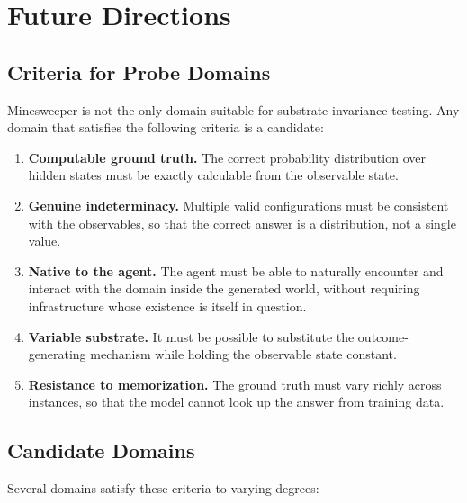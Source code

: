 \documentclass[12pt,a4paper]{article}
\begin{document}
\section{Future Directions}
\label{sec:future}

\subsection{Criteria for Probe Domains}
\label{sec:criteria}

Minesweeper is not the only domain suitable for substrate invariance testing. Any domain that satisfies the following criteria is a candidate:

\begin{enumerate}[nosep]
    \item \textbf{Computable ground truth.} The correct probability distribution over hidden states must be exactly calculable from the observable state.
    \item \textbf{Genuine indeterminacy.} Multiple valid configurations must be consistent with the observables, so that the correct answer is a distribution, not a single value.
    \item \textbf{Native to the agent.} The agent must be able to naturally encounter and interact with the domain inside the generated world, without requiring infrastructure whose existence is itself in question.
    \item \textbf{Variable substrate.} It must be possible to substitute the outcome-generating mechanism while holding the observable state constant.
    \item \textbf{Resistance to memorization.} The ground truth must vary richly across instances, so that the model cannot look up the answer from training data.
\end{enumerate}

\subsection{Candidate Domains}
\label{sec:candidates}

Several domains satisfy these criteria to varying degrees:
\end{document}

